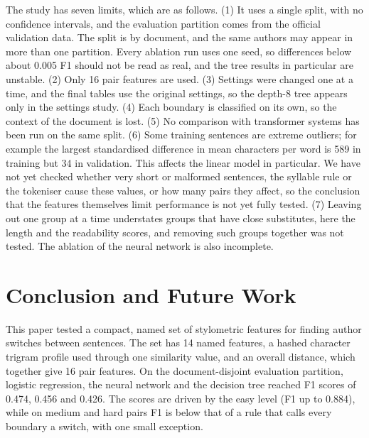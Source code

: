 \documentclass[runningheads]{llncs}
\begin{document}
The study has seven limits, which are as follows. (1) It uses a single split, with no confidence intervals, and the evaluation partition comes from the official validation data. The split is by document, and the same authors may appear in more than one partition. Every ablation run uses one seed, so differences below about 0.005 F1 should not be read as real, and the tree results in particular are unstable. (2) Only 16 pair features are used. (3) Settings were changed one at a time, and the final tables use the original settings, so the depth-8 tree appears only in the settings study. (4) Each boundary is classified on its own, so the context of the document is lost. (5) No comparison with transformer systems has been run on the same split. (6) Some training sentences are extreme outliers; for example the largest standardised difference in mean characters per word is 589 in training but 34 in validation. This affects the linear model in particular. We have not yet checked whether very short or malformed sentences, the syllable rule or the tokeniser cause these values, or how many pairs they affect, so the conclusion that the features themselves limit performance is not yet fully tested. (7) Leaving out one group at a time understates groups that have close substitutes, here the length and the readability scores, and removing such groups together was not tested. The ablation of the neural network is also incomplete.

\section{Conclusion and Future Work}
\label{sec:conclusion}

This paper tested a compact, named set of stylometric features for finding author switches between sentences. The set has 14 named features, a hashed character trigram profile used through one similarity value, and an overall distance, which together give 16 pair features. On the document-disjoint evaluation partition, logistic regression, the neural network and the decision tree reached F1 scores of 0.474, 0.456 and 0.426. The scores are driven by the easy level (F1 up to 0.884), while on medium and hard pairs F1 is below that of a rule that calls every boundary a switch, with one small exception.
\end{document}
